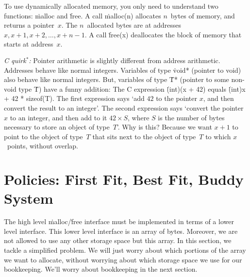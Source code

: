 To use dynamically allocated memory, you only need to understand two functions:
  \.{malloc} and \.{free}.
A call \.{malloc(n)} allocates $n$~bytes of memory,
  and returns a pointer~$x$.
The $n$~allocated bytes are at addresses $x, x+1, x+2,\ldots, x+n-1$.
A call \.{free(x)} deallocates the block of memory that starts at address~$x$.

\smallskip\noindent
\emph{C quirk${}^*$:}\enspace
Pointer arithmetic is slightly different from address arithmetic.
Addresses behave like normal integers.
Variables of type \.{void*} (pointer to void) also behave like normal integers.
But, variables of type \.{T*} (pointer to some non-void type \.{T})
  have a funny addition:
The C expression \.{(int)(x + 42)} equals \.{(int)x + 42 * sizeof(T)}.
The first expression says `add $42$ to the pointer $x$,
  and then convert the result to an integer'.
The second expression says `convert the pointer $x$ to an integer,
  and then add to it $42\times S$,
  where $S$ is the number of bytes necessary to store an object of type~$T$'.
Why is this?
Because we want $x+1$ to point to the object of type~$T$
  that sits next to the object of type~$T$ to which $x$~points,
  without overlap.


\section{Policies: First Fit, Best Fit, Buddy System}

The high level \.{malloc}\slash\.{free} interface
  must be implemented in terms of a lower level interface.
This lower level interface is an array of bytes.
Moreover, we are not allowed to use any other storage space but this array.
In this section, we tackle a simplified problem.
We will just worry about which portions of the array we want to allocate,
  without worrying about which storage space we use for our bookkeeping.
We'll worry about bookkeeping in the next section.

